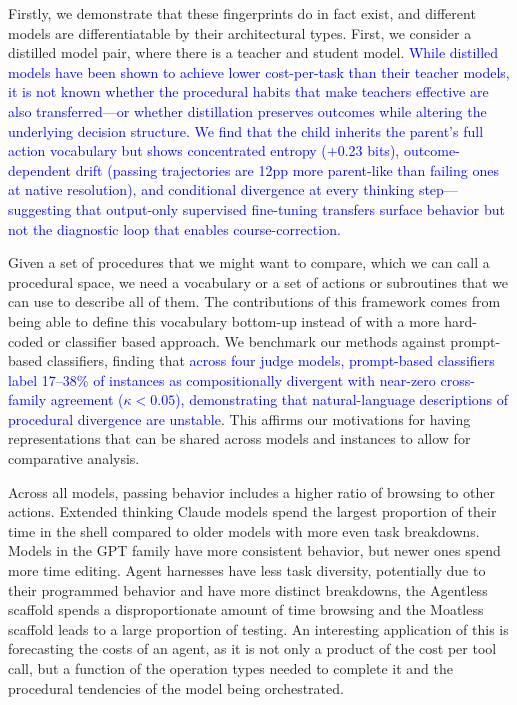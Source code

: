 \documentclass[11pt]{article}
\begin{document}
Firstly, we demonstrate that these fingerprints do in fact exist, and different models are differentiatable by their architectural types. First, we consider a distilled model pair, where there is a teacher and student model. \textcolor{blue}{While distilled models have been shown to achieve lower cost-per-task than their teacher models, it is not known whether the procedural habits that make teachers effective are also transferred---or whether distillation preserves outcomes while altering the underlying decision structure. We find that the child inherits the parent's full action vocabulary but shows concentrated entropy ($+$0.23 bits), outcome-dependent drift (passing trajectories are 12pp more parent-like than failing ones at native resolution), and conditional divergence at every thinking step---suggesting that output-only supervised fine-tuning transfers surface behavior but not the diagnostic loop that enables course-correction.}

Given a set of procedures that we might want to compare, which we can call a procedural space, we need a vocabulary or a set of actions or subroutines that we can use to describe all of them. The contributions of this framework comes from being able to define this vocabulary bottom-up instead of with a more hard-coded or classifier based approach. We benchmark our methods against prompt-based classifiers, finding that \textcolor{blue}{across four judge models, prompt-based classifiers label 17--38\% of instances as compositionally divergent with near-zero cross-family agreement ($\kappa < 0.05$), demonstrating that natural-language descriptions of procedural divergence are unstable}. This affirms our motivations for having representations that can be shared across models and instances to allow for comparative analysis.

Across all models, passing behavior includes a higher ratio of browsing to other actions. Extended thinking Claude models spend the largest proportion of their time in the shell compared to older models with more even task breakdowns. Models in the GPT family have more consistent behavior, but newer ones spend more time editing.  Agent harnesses have less task diversity, potentially due to their programmed behavior and have more distinct breakdowns, the Agentless scaffold spends a disproportionate amount of time browsing and the Moatless scaffold leads to a large proportion of testing. An interesting application of this is forecasting the costs of an agent, as it is not only a product of the cost per tool call, but a function of the operation types needed to complete it and the procedural tendencies of the model being orchestrated.
\end{document}
